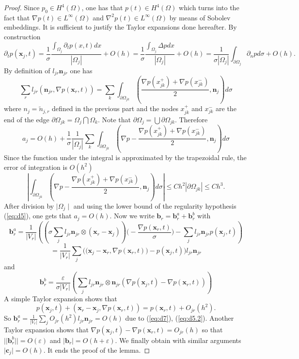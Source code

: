\documentclass[a4paper,french,english,10pt]{article}
\newcommand\njr{\mathbf{n}_{jr}}
\newcommand\eps{\varepsilon}
\newcommand\xj{\mathbf{x}_j}
\newcommand\xr{\mathbf{x}_r}
\newcommand\cc{\mathbf{c}}
\newcommand\bb{\mathbf{b}}
\newcommand\cj{\cc_j}
\newcommand\br{\bb_r}
\begin{document}
\begin{proof} 
Since $p_0\in H^{4}(\Omega)$, one has that $p(t)\in H^{4}(\Omega)$ 
which turns into the fact that $\nabla p(t)\in L^\infty(\Omega)$ and $\nabla ^2p(t)\in L^\infty(\Omega)$ by means of 
Sobolev embeddings. It is sufficient to justify 
the Taylor expansions done hereafter.
By construction
$$
\partial_t p(\xj,t)=\frac{1}{\sigma}\frac{\int_{\Omega_j} \partial_t
p(x,t)dx}{\left| \Omega_j \right|}+O(h)=
\frac{1}{\sigma}\frac{\int_{\Omega_j} \Delta p dx}{\left| \Omega_j
\right|}+O(h)=
\frac1{\sigma \left| \Omega_j \right|}\int_{\partial \Omega_j} \partial_n p d\sigma
+O(h).
$$
By definition of $l_{jr} \njr$ one has
$$
 \sum_r l_{jr}\left(\njr, \nabla p (\xr,t) \right)=
\sum_k \int_{\partial\Omega_{jk}} \left(
\frac{  \nabla p\left(x_{jk}^+ \right)+ \nabla p\left(x_{jk}^- \right)   }2,
\mathbf{n}_j \right) d\sigma 
$$
where $n_j=\tilde{n}_{j,r}$ defined in the previous part and the nodes $x_{jk}^+$ and $x_{jk}^-$ are the end of the edge
$\partial\Omega_{jk}=\Omega_j\bigcap\Omega_k$. Note that  $\partial \Omega_j =
\bigcup\partial\Omega_{jk} $.
Therefore
$$
a_j=O(h) + \frac{1}{\sigma}\frac1{\left| \Omega_j \right|}
\sum_k \int_{\partial\Omega_{jk}} \left(
\nabla p- \frac{  \nabla p\left(x_{jk}^+ \right)+ \nabla p\left(x_{jk}^- \right)
  }2, \mathbf{n}_j \right) d\sigma 
$$
Since the function under the integral is approximated by the trapezoidal rule, 
the error of integration
 is $O(h^2)$
$$
\left| \int_{\partial\Omega_{jk}} \left(
\nabla p- \frac{  \nabla p\left(x_{jk}^+ \right)+ \nabla p\left(x_{jk}^- \right)
  }2, \mathbf{n}_j \right) d\sigma   \right| \leq C h^2 \left|
\partial\Omega_{jk}\right|\leq Ch^3.
$$
After division by $\mid \Omega_j \mid$ and using the lower bound of the
regularity hypothesis (\ref{eq:d5}),
one gets that $a_j=O(h)$.
Now we write  $\br=\br^a+\br^b$  with
$$
\br^a = 
\frac1{\vert V_r \vert}\left(  \left( \sigma \sum_j l_{jr}\njr\otimes
\left(\xr - \xj    \right)  \right)  
 \bigg(-\frac{\nabla p (\xr,t)}{\sigma}\bigg) -   \sum_j  l_{jr}\njr
p(\xj,t)\right)
$$
$$
= \frac1{\vert V_r \vert} \sum_j  
\bigg(
  \big( \xj - \xr  , \nabla p (\xr,t)   \big)  
  -    p(\xj,t)  
\bigg)
l_{jr}\njr
$$
and 
$$
\br^b = 
\frac\eps{\sigma \vert V_r \vert} \left(  \sum_j l_{jr}\njr\otimes \njr \left( \nabla p
(\xj,t)  - \nabla p (\xr,t)\right )\right )
$$
A simple Taylor expansion shows that
$$
     p(\xj,t)+
\left(\xr - \xj  , \nabla p (\xr,t)  \right) 
  = p(\xr,t)+O_{jr}(h^2).
$$
So
$
\br ^a= 
\frac1{\vert V_r \vert}  \sum_j O_{jr}(h^2)  l_{jr}\njr =O(h)
$
due to (\ref{eq:d7}), (\ref{eq:d5.2}). 
Another Taylor expansion shows that 
$ \nabla p (\xj,t)-\nabla p (\xr,t)=O_{jr}(h)$
so that 
$\vert \vert \br^b\vert \vert=O(\eps)$ and
$| \br|=O(h+\eps)$.
 We finally obtain with similar arguments
$ \vert \cj  \vert=O( h)$. 
It ends the proof of the lemma.
\end{proof}
\end{document}
